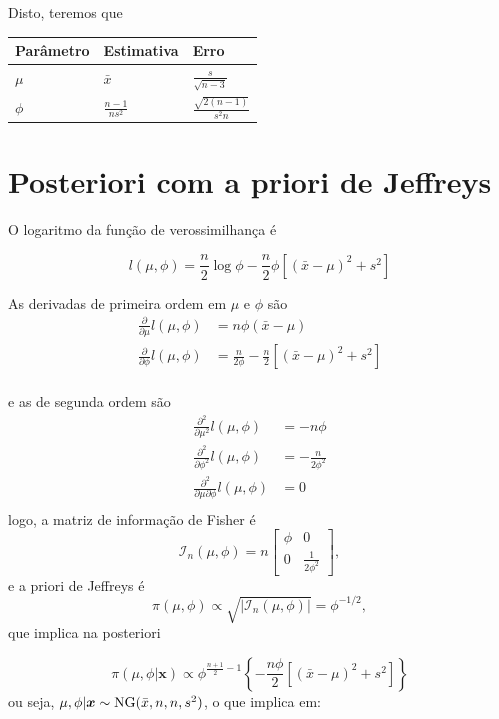 \documentclass[
  letterpaper,
  DIV=11,
  numbers=noendperiod]{scrreprt}
\theoremstyle{plain}
\theoremstyle{definition}
\theoremstyle{definition}
\theoremstyle{remark}
\begin{document}
Disto, teremos que

\begin{longtable}[]{@{}lll@{}}
\toprule\noalign{}
Parâmetro & Estimativa & Erro \\
\midrule\noalign{}
\endhead
\bottomrule\noalign{}
\endlastfoot
\(\mu\) & \(\bar{x}\) & \(\frac{s}{\sqrt{n-3}}\) \\
\(\phi\) & \(\frac{n-1}{ns^2}\) & \(\frac{\sqrt{2(n-1)}}{s^2n}\) \\
\end{longtable}

\section{Posteriori com a priori de
Jeffreys}\label{posteriori-com-a-priori-de-jeffreys}

O logaritmo da função de verossimilhança é

\[l(\mu,\phi)=\frac{n}{2}\log\phi -\frac{n}{2}\phi\left[(\bar{x}-\mu)^2 + s^2\right]\]

As derivadas de primeira ordem em \(\mu\) e \(\phi\) são \[\begin{align}
\frac{\partial}{\partial \mu}l(\mu,\phi)&=n\phi(\bar{x}-\mu)\\
\frac{\partial}{\partial \phi}l(\mu,\phi)&=\frac{n}{2\phi}-\frac{n}{2}\left[(\bar{x}-\mu)^2 + s^2\right]\\
\end{align}\]

e as de segunda ordem são \[\begin{align}
\frac{\partial^2}{\partial \mu^2}l(\mu,\phi)&=-n\phi\\
\frac{\partial^2}{\partial \phi^2}l(\mu,\phi)&=-\frac{n}{2\phi^2}\\
\frac{\partial^2}{\partial \mu\partial \phi}l(\mu,\phi)&=0\\
\end{align}
\] logo, a matriz de informação de Fisher é
\[\mathcal{I}_n(\mu,\phi)=n\left[\begin{array}{cc}\phi & 0 \\0 & \frac{1}{2\phi^2}\end{array}\right],\]
e a priori de Jeffreys é
\[\pi(\mu,\phi)\propto \sqrt{|\mathcal{I}_n(\mu,\phi)|}=\phi^{-1/2},\]
que implica na posteriori

\[\pi(\mu,\phi|\boldsymbol{x})\propto \phi^{\frac{n+1}{2}-1}\left\{-\frac{n\phi}{2}\left[(\bar{x}-\mu)^2 +s^2 \right]\right\}\]
ou seja, \(\mu,\phi|\boldsymbol{x}\sim\hbox{NG}(\bar{x},n,n,s^2)\), o
que implica em:
\end{document}
